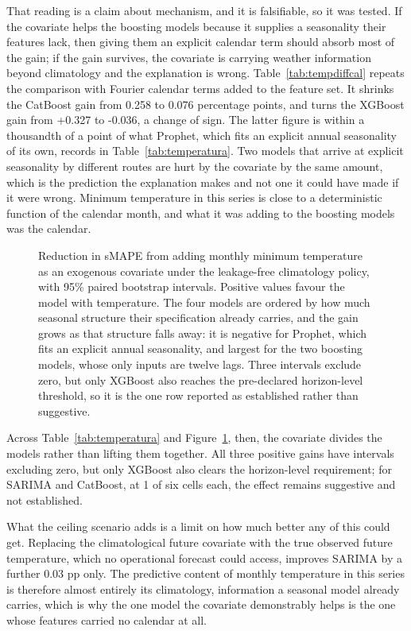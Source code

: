 That reading is a claim about mechanism, and it is falsifiable, so it was tested. If the
covariate helps the boosting models because it supplies a seasonality their features lack,
then giving them an explicit calendar term should absorb most of the gain; if the gain
survives, the covariate is carrying weather information beyond climatology and the
explanation is wrong. Table~\ref{tab:tempdiffcal} repeats the comparison with Fourier calendar terms
added to the feature set. It shrinks the CatBoost gain from 0.258 to 0.076 percentage points,
and turns the XGBoost gain from +0.327 to -0.036, a change of sign. The latter figure is
within a thousandth of a point of what Prophet, which fits an explicit annual seasonality of
its own, records in Table~\ref{tab:temperatura}. Two models that arrive at explicit
seasonality by different routes are hurt by the covariate by the same amount, which is the
prediction the explanation makes and not one it could have made if it were wrong. Minimum
temperature in this series is close to a deterministic function of the calendar month, and
what it was adding to the boosting models was the calendar.

\begin{figure}[htbp]
\centering

\caption{Reduction in sMAPE from adding monthly minimum temperature as an exogenous
covariate under the leakage-free climatology policy, with 95\% paired bootstrap intervals.
Positive values favour the model with temperature. The four models are ordered by how much
seasonal structure their specification already carries, and the gain grows as that
structure falls away: it is negative for Prophet, which fits an explicit annual
seasonality, and largest for the two boosting models, whose only inputs are twelve lags.
Three intervals exclude zero, but only XGBoost also reaches the pre-declared horizon-level
threshold, so it is the one row reported as established rather than suggestive.}
\label{fig:temp}
\end{figure}

Across Table~\ref{tab:temperatura} and Figure~\ref{fig:temp}, then, the covariate divides
the models rather than lifting them together. All three positive gains have intervals
excluding zero, but only XGBoost also clears the horizon-level requirement; for SARIMA and
CatBoost, at 1 of six cells each, the effect remains suggestive and not established.

What the ceiling scenario adds is a limit on how much better any of this could get.
Replacing the climatological future covariate with the true observed future temperature,
which no operational forecast could access, improves SARIMA by a further 0.03 pp only. The
predictive content of monthly temperature in this series is therefore almost entirely its
climatology, information a seasonal model already carries, which is why the one model the
covariate demonstrably helps is the one whose features carried no calendar at all.

